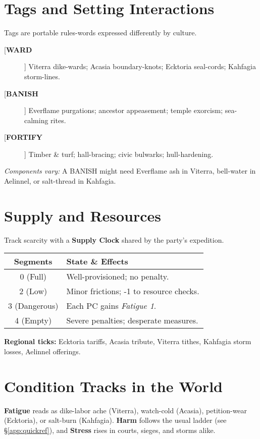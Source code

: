 \begin{multicols}{2}
\section{Tags and Setting Interactions}
Tags are portable rules-words expressed differently by culture.
\begin{description}
  \item[[\textbf{WARD}]]  Viterra dike-wards; Acasia boundary-knots; Ecktoria seal-cords; Kahfagia storm-lines.
  \item[[\textbf{BANISH}]]  Everflame purgations; ancestor appeasement; temple exorcism; sea-calming rites.
  \item[[\textbf{FORTIFY}]]  Timber \& turf; hall-bracing; civic bulwarks; hull-hardening.
\end{description}
\emph{Components vary:} A BANISH might need Everflame ash in Viterra, bell-water in Aelinnel, or salt-thread in Kahfagia.

\section{Supply and Resources}
\label{world:supply}
Track scarcity with a \textbf{Supply Clock} shared by the party’s expedition.
\begin{center}
\begin{tabular}{cl}
\toprule
\textbf{Segments} & \textbf{State \& Effects} \\
\midrule
0 (Full) & Well-provisioned; no penalty. \\
2 (Low) & Minor frictions; -1 to resource checks. \\
3 (Dangerous) & Each PC gains \emph{Fatigue 1}. \\
4 (Empty) & Severe penalties; desperate measures. \\
\bottomrule
\end{tabular}
\end{center}
\textbf{Regional ticks:}  Ecktoria tariffs, Acasia tribute, Viterra tithes, Kahfagia storm losses, Aelinnel offerings.

\section{Condition Tracks in the World}
\textbf{Fatigue} reads as dike-labor ache (Viterra), watch-cold (Acasia), petition-wear (Ecktoria), or salt-burn (Kahfagia). \textbf{Harm} follows the usual ladder (see \S\ref{app:quickref}), and \textbf{Stress} rises in courts, sieges, and storms alike.


\end{multicols}
